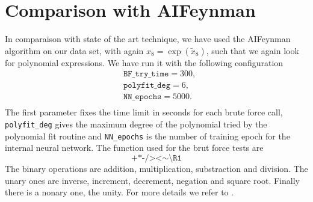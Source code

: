 \documentclass[11pt,a4paper]{article}
\newcommand{\ce}[1]{\marginpar{\parbox{\marginparwidth}{\boldmath $\Longleftarrow$}}{\boldmath\bfseries (ce: #1)}}
\begin{document}
\appendix
\section{Comparison with AIFeynman} \ce{Appendix?}
In comparaison with state of the art technique, we have used the AIFeynman algorithm on our data set, with again $x_8 = \exp(\tilde{x}_8)$, such that we again look for polynomial expressions. We have run it with the following configuration 
\begin{equation}
	\begin{aligned}
		&\texttt{BF\_try\_time} = 300, \\
		&\texttt{polyfit\_deg} = 6, \\
		&\texttt{NN\_epochs} = 5000.\\
	\end{aligned}
\end{equation}
The first parameter fixes the time limit in seconds for each brute force call, \texttt{polyfit\_deg} gives the maximum degree of the polynomial tried by the polynomial fit routine and \texttt{NN\_epochs} is the number of training epoch for the internal neural network. The function used for the brut force tests are 
\begin{equation}
\texttt{+*-/><} \sim \texttt{\textbackslash R1}
\end{equation}
The binary operations are addition, multiplication, substraction and division. The unary ones are inverse, increment, decrement, negation and square root. Finally there is a nonary one, the unity. For more details we refer to \cite{Udrescu:2019mnk}.
\end{document}
